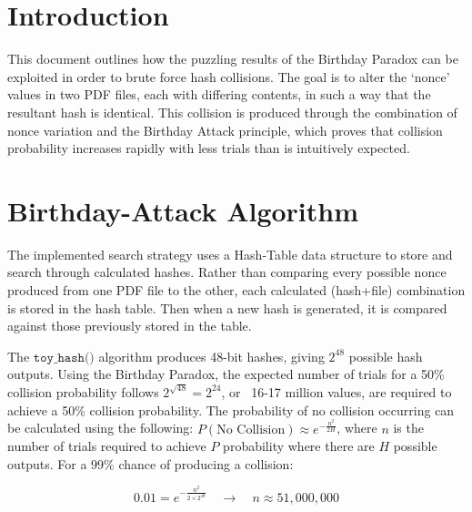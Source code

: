 \documentclass[11pt,a4paper]{article}
\date{Semester 2, 2026}
\author{
  James Oakey \quad (\texttt{22709404})\\
  \and
  Brent Tankink\quad (\texttt{23842541})
}
\begin{document}
\maketitle

\section{Introduction}

This document outlines how the puzzling results of the Birthday Paradox can be
exploited in order to brute force hash collisions. The goal is to alter the 
`nonce' values in two PDF files, each with differing contents, in such a way 
that the resultant hash is identical. This collision is produced through the combination of nonce variation and the 
Birthday Attack principle, which proves that collision probability increases 
rapidly with less trials than is intuitively expected. 

\section{Birthday-Attack Algorithm}
\label{sec:bday}

The implemented search strategy uses a Hash-Table data structure to store and 
search through calculated hashes. Rather than comparing every possible 
nonce produced from one PDF file to the other, each calculated (hash+file) 
combination is stored in the hash table. Then when a new hash is generated, it is
compared against those previously stored in the table. 

The $\texttt{toy\_hash()}$ algorithm produces 48-bit hashes, giving $2^{48}$ 
possible hash outputs. Using the Birthday Paradox, the expected number of trials for 
a 50\% collision probability follows $2^{\sqrt{48}}=2^{24}$, or ~16-17 million values, 
are required to achieve a 50\% collision probability.
The probability of no collision occurring can be calculated using the following: 
$P(\text{No Collision})\approx e^{-\frac{n^2}{2H}}$, where $n$ is the 
number of trials required to achieve $P$ probability where there 
are $H$ possible outputs. For a 99\% chance of producing a collision:

$$0.01=e^{-\frac{n^2}{2\times2^{48}}}\quad\rightarrow\quad n\approx51,000,000$$
\end{document}
